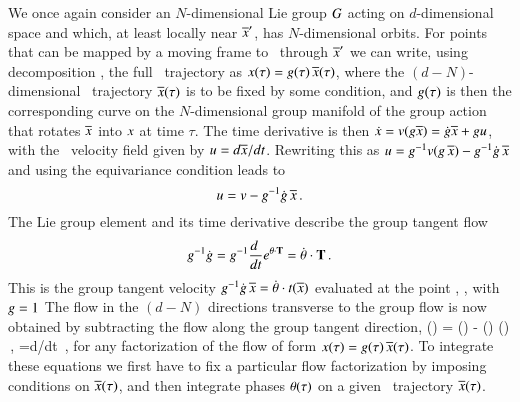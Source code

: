 We once again consider an $N$-dimensional Lie group $G$ acting on $d$-dimensional
space and which, at least locally near ${\overline{x}'}$, has $N$-dimensional orbits.
For points that can be mapped by a moving frame to \slice\ through ${\overline{x}'}$ 
we can write, using decomposition , the full \statesp\
trajectory as $x(\tau)= g(\tau)\,\overline{x}(\tau)$, where the
$(d\!-\!N)$-dim\-ens\-ion\-al \reducedsp\ trajectory $\overline{x}(\tau)$
is to be fixed by some condition, and $g(\tau)$ is then the
corresponding curve on the $N$-dim\-ens\-ion\-al group manifold of
the group action that rotates $\overline{x}$ into $x$ at time
$\tau$. The time derivative is then $\dot{x}=
v(g\overline{x}) = \dot{g}\overline{x} + gu$,
with the \reducedsp\ velocity field given by
$u={d\overline{x}}/{dt}$. Rewriting this as $
u = g^{-1} v(g \, \overline{x})
          - g^{-1} \dot{g} \, \overline{x}
$ and using the equivariance condition 
leads to
\[
u = v - g^{-1} \dot{g} \, \overline{x}
\,.
\]
The Lie group element  and its time
derivative describe the group tangent flow
\[
g^{-1} \dot{g} =
g^{-1}\frac{d~}{dt} e^{{\bf \theta} \cdot \mathbf{T} } =
\dot{{\bf \theta}} \cdot \mathbf{T}
\,.
\]
This is the group tangent velocity $g^{-1} \dot{g}
\, \overline{x} = \dot{{\bf \theta}} \cdot t(\overline{x})$
evaluated at the point \sspRed, \ie, with ${g} = 1$
 The flow in the $(d\!-\!N)$
directions transverse to the group flow is now obtained by
subtracting the flow along the group tangent direction,
\beq
\velRed(\sspRed) = \vel(\sspRed)
      - \dot{\gSpace}(\sspRed) \cdot \groupTan(\sspRed)
\,,\qquad
\velRed={d\sspRed}/{dt}
\,,
for any factorization of the flow of form $x(\tau)=
g(\tau)\, \overline{x}(\tau)$. To integrate these equations we
first have to fix a particular flow factorization by imposing
conditions on $\overline{x}(\tau)$, and then integrate phases
${\bf \theta}(\tau)$ on a given \reducedsp\ trajectory
$\overline{x}(\tau)$.


